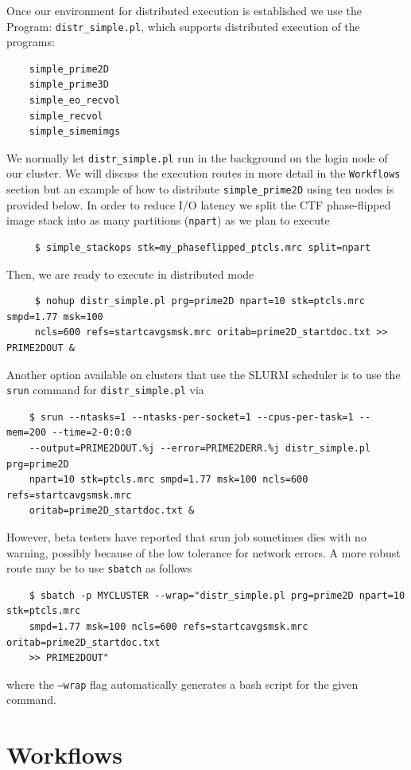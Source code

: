 \documentclass[a4paper,11pt]{article}
\newcommand{\prgname}[1]{\textcolor{NavyBlue}{\texttt{#1}}}
\begin{document}
Once our environment for distributed execution is established we use the {Program: \prgname{distr\_simple.pl}}, which supports distributed execution of the programs:
\begin{verbatim}
    simple_prime2D
    simple_prime3D
    simple_eo_recvol
    simple_recvol
    simple_simemimgs
\end{verbatim}
We normally let \prgname{distr\_simple.pl} run in the background on the login node of our cluster. We will discuss the execution routes in more detail in the \texttt{Workflows} section but an example of how to distribute \prgname{simple\_prime2D} using ten nodes is provided below. In order to reduce I/O latency we split the CTF phase-flipped image stack into as many partitions (\texttt{npart}) as we plan to execute
\begin{verbatim}
     $ simple_stackops stk=my_phaseflipped_ptcls.mrc split=npart
\end{verbatim}
Then, we are ready to execute in distributed mode
\begin{verbatim}
     $ nohup distr_simple.pl prg=prime2D npart=10 stk=ptcls.mrc smpd=1.77 msk=100
     ncls=600 refs=startcavgsmsk.mrc oritab=prime2D_startdoc.txt >> PRIME2DOUT &
\end{verbatim}
Another option available on clusters that use the SLURM scheduler is to use the \texttt{srun} command for \prgname{distr\_simple.pl} via
\begin{verbatim}
    $ srun --ntasks=1 --ntasks-per-socket=1 --cpus-per-task=1 --mem=200 --time=2-0:0:0
    --output=PRIME2DOUT.%j --error=PRIME2DERR.%j distr_simple.pl prg=prime2D 
    npart=10 stk=ptcls.mrc smpd=1.77 msk=100 ncls=600 refs=startcavgsmsk.mrc 
    oritab=prime2D_startdoc.txt &
\end{verbatim}
However, beta testers have reported that srun job sometimes dies with no warning, possibly because of the low tolerance for network errors. A more robust route may be to use \texttt{sbatch} as follows
\begin{verbatim}
    $ sbatch -p MYCLUSTER --wrap="distr_simple.pl prg=prime2D npart=10 stk=ptcls.mrc
    smpd=1.77 msk=100 ncls=600 refs=startcavgsmsk.mrc oritab=prime2D_startdoc.txt 
    >> PRIME2DOUT"
\end{verbatim}
where the \texttt{--wrap} flag automatically generates a bash script for the given command.

\section{Workflows}
\end{document}
